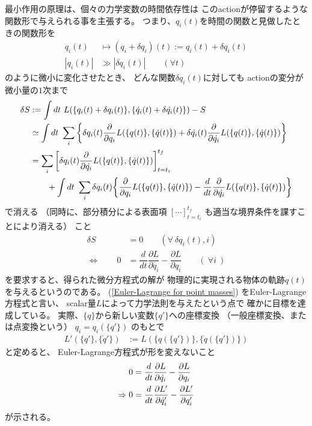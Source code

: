 最小作用の原理は、個々の力学変数の時間依存性は
このactionが停留するような関数形で与えられる事を主張する。
つまり、$q_i(t)$を時間の関数と見做したときの関数形を
\begin{align}
  q_i(t) &\mapsto (q_i+\delta q_i)(t) := q_i(t) + \delta q_i(t)
  \\
  | q_i(t) | & \gg | \delta q_i(t) |
  \qquad (\forall t)
\end{align}
のように微小に変化させたとき、
どんな関数$\delta q_i(t)$に対しても
actionの変分が微小量の$1$次まで
\begin{align}
  \delta S &:= \int dt\ L(\{ q_i(t) + \delta q_i(t) \},
  \{ \dot{q}_i(t) + \delta \dot{q_i}(t) \} )
  - S
\notag\\&\simeq
  \int dt\ \sum_i
  \bigg\{
    \delta q_i(t)
    \dfrac{\partial}{\partial q_i}
    L(\{ q(t) \},
    \{ \dot{q}(t) \} )
+
    \delta \dot{q_i}(t)
    \dfrac{\partial}{\partial \dot{q_i}}
    L(\{ q(t) \},
    \{ \dot{q}(t) \} )
  \bigg\}
\notag\\&=
  \sum_i
  \bigg[
    \delta q_i(t)
    \dfrac{\partial}{\partial \dot{q_i}}
    L(\{ q(t) \},
    \{ \dot{q}(t) \} )
  \bigg]_{t=t_i}^{t_f}
\notag\\&\qquad
  +
\int dt\ \sum_i
\delta q_i(t)
\bigg\{
  \dfrac{\partial}{\partial q_i}
  L(\{ q(t) \},
  \{ \dot{q}(t) \} )
-
  \dfrac{d}{dt}
  \dfrac{\partial}{\partial \dot{q_i}}
  L(\{ q(t) \},
  \{ \dot{q}(t) \} )
\bigg\}
\label{variation of action}
\end{align}
で消える
（同時に、部分積分による表面項
$[\cdots]_{t=t_i}^{t_f}$
も適当な境界条件を課すことにより消える）
こと
\begin{align}
  \delta S &= 0
  \qquad (\forall\ \delta q_i(t), i)
\\\Leftrightarrow\qquad
  0 &=
  \dfrac{d}{dt}\dfrac{\partial L}{\partial \dot{q_i} }
  - \dfrac{\partial L}{\partial q_i }
  \qquad (\ \forall i\ )
\label{Euler-Lagrange for point masses}
\end{align}
を要求すると、得られた微分方程式の解が
物理的に実現される物体の軌跡${q(t)}$
を与えるというのである。
(\ref{Euler-Lagrange for point masses})
をEuler-Lagrange方程式と言い、
scalar量$L$によって力学法則を与えたという点で
確かに目標を達成している。
実際、$\{q\}$から新しい変数$\{ q'\}$への座標変換
（一般座標変換、または点変換という）
$q_i = q_i(\{q'\})$
のもとで
\begin{align}
  L'(\{q'\}, \{\dot{q}'\}) &:= L(\{q(\{q'\})\}, \{\dot{q}(\{q'\})\})
\end{align}
と定めると、
Euler-Lagrange方程式が形を変えないこと
\begin{align}
  0 &=
  \dfrac{d}{dt}\dfrac{\partial L}{\partial \dot{q_i} }
  - \dfrac{\partial L}{\partial q_i }
\notag\\\Rightarrow
0 &=
\dfrac{d}{dt}\dfrac{\partial L'}{\partial \dot{q}'_i }
- \dfrac{\partial L'}{\partial q_i' }
\label{point transformation}
\end{align}
が示される。


